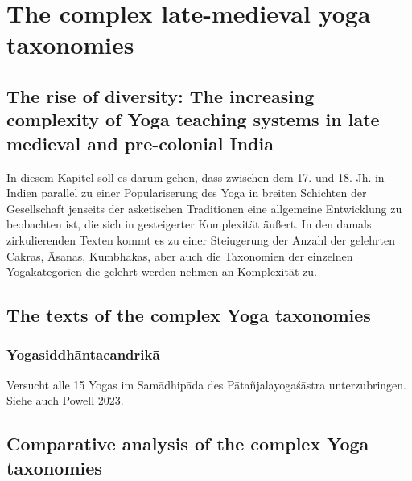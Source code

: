\chapter{The complex late-medieval yoga taxonomies}
\label{yogas_list}
\clearpage


\section{The rise of diversity: The increasing complexity of Yoga teaching systems in late medieval and pre-colonial India}

In diesem Kapitel soll es darum gehen, dass zwischen dem 17. und 18. Jh. in Indien parallel zu einer Populariserung des Yoga in breiten Schichten der Gesellschaft jenseits der asketischen Traditionen eine allgemeine Entwicklung zu beobachten ist, die sich in gesteigerter Komplexität äußert. In den damals zirkulierenden Texten kommt es zu einer Steiugerung der Anzahl der gelehrten Cakras, Āsanas, Kumbhakas, aber auch die Taxonomien der einzelnen Yogakategorien die gelehrt werden nehmen an Komplexität zu. 

\section{The texts of the complex Yoga taxonomies}

\subsection{Yogasiddhāntacandrikā}

Versucht alle 15 Yogas im Samādhipāda des Pātañjalayogaśāstra unterzubringen.
Siehe auch Powell 2023. 



\section{Comparative analysis of the complex Yoga taxonomies}
\label{yogatax}


